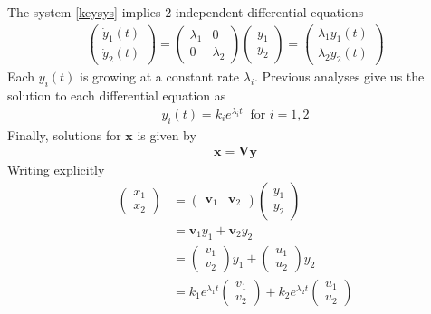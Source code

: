 \documentclass[11pt,a4paper]{book}
\theoremstyle{definition}\newtheorem{definition}{Definition}
\theoremstyle{definition}\newtheorem{fact}{Fact}
\theoremstyle{definition}\newtheorem{remark}{Remark}
\theoremstyle{definition}\newtheorem{ex}{Ex.}
\theoremstyle{definition}\newtheorem{project}{Project}
\theoremstyle{definition}\newtheorem{problem}{Problem}
\theoremstyle{definition}\newtheorem{example}{Example}
\numberwithin{theorem}{section}
\numberwithin{corollary}{chapter}
\numberwithin{assumption}{chapter}
\numberwithin{definition}{chapter}
\numberwithin{prop}{chapter}
\numberwithin{notation}{chapter}
\numberwithin{problem}{chapter}
\numberwithin{example}{chapter}
\numberwithin{fact}{chapter}
\numberwithin{ex}{chapter}
\def\v{\mathbf v}
\def\x{\mathbf x}
\def\y{\mathbf y}
\def\V{\mathbf V}
\begin{document}
	The system \eqref{keysys} implies 2 independent differential equations
	\begin{align*}
		\begin{pmatrix}
			\dot{y}_1(t) \\ \dot{y}_2(t)
		\end{pmatrix} 
		= 
		\begin{pmatrix}
			\lambda_1 & 0 \\
			0 & \lambda_2
		\end{pmatrix}
		\begin{pmatrix}
			y_1 \\ y_2
		\end{pmatrix} 
		= 
		\begin{pmatrix}
			\lambda_1 y_1(t) \\ \lambda_2 y_2(t)
		\end{pmatrix}
	\end{align*}
	Each $y_i(t)$ is growing at a constant rate $\lambda_i$. Previous analyses give us the solution to each differential equation as
	\begin{align*}
		y_i (t) = k_i e^{\lambda_i t} \ \text{ for $i=1,2$} 
	\end{align*}
	Finally, solutions for $\x$ is given by
	\begin{align*}
		\x = \V \y 
	\end{align*}
	Writing explicitly
	\begin{align*}
		\begin{pmatrix}
			x_1 \\ x_2  
		\end{pmatrix}
		&= 
		\begin{pmatrix}
			\v_1 & \v_2
		\end{pmatrix}
		\begin{pmatrix}
			y_1 \\ y_2
		\end{pmatrix} \\
		&= 
		\v_1 y_1 + \v_2 y_2		\\
		&= \begin{pmatrix}
			v_1 \\ v_2
		\end{pmatrix} y_1 + \begin{pmatrix}
			u_1 \\ u_2
		\end{pmatrix} y_2 \\
		&= k_1 e^{\lambda_1 t} \begin{pmatrix}
			v_1 \\ v_2
		\end{pmatrix} + k_2 e^{\lambda_2 t} \begin{pmatrix}
			u_1 \\ u_2 \end{pmatrix}
	\end{align*}
\end{document}
